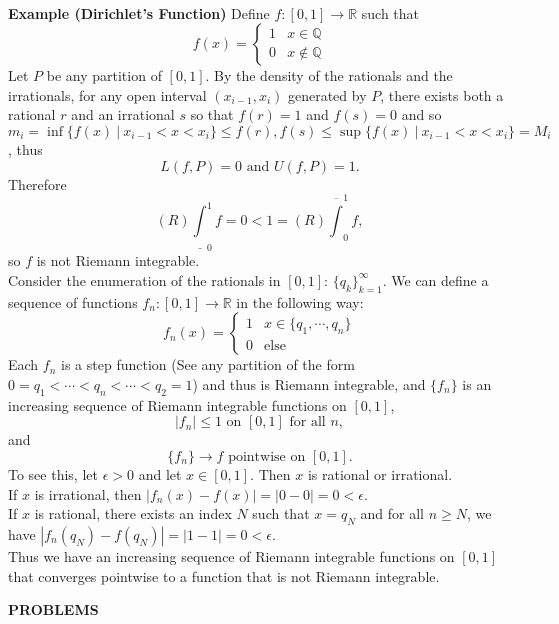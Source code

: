 \begin{flushleft}
\[    \]\\\bigskip
    \textbf{Example (Dirichlet's Function)}
    Define $f:[0,1]\to\mathbb{R}$ such that
    \[
        f(x)=
        \begin{cases}
            1&x\in\mathbb{Q}\\
            0&x\notin\mathbb{Q}
        \end{cases}    
    \] 
    Let $P$ be any partition of $[0,1]$.
    By the density of the rationals and the irrationals, for any open interval $(x_{i-1},x_i)$ generated by $P$, there exists both a rational $r$ and an irrational $s$ so that $f(r)=1$ and $f(s)=0$ and so $m_i=\inf\{f(x)\ |\ x_{i-1}<x<x_i\}\le f(r),f(s)\le\sup\{f(x)\ |\ x_{i-1}<x<x_i\}=M_i$, thus
    \[
        L(f,P)=0\text{ and }U(f,P)=1.
    \]
    Therefore
    \[
        (R)\underline\int_0^1f=0<1=(R)\overline\int_0^1f,
    \]
    so $f$ is not Riemann integrable.
    \\Consider the enumeration of the rationals in $[0,1]$: $\{q_k\}_{k=1}^\infty$.
    We can define a sequence of functions $f_n:[0,1]\to\mathbb{R}$ in the following way:
    \[
        f_n(x)=
        \begin{cases}
            1&x\in\{q_1,\cdots,q_n\}\\
            0&\text{else}
        \end{cases}
    \]
    Each $f_n$ is a step function (See any partition of the form $0=q_1<\cdots<q_n<\cdots<q_2=1$) and thus is Riemann integrable, and $\{f_n\}$ is an increasing sequence of Riemann integrable functions on $[0,1]$,
    \[
        |f_n|\le1\text{ on }[0,1]\text{ for all }n,
    \]
    and 
    \[
        \{f_n\}\to f\text{ pointwise on }[0,1].
    \]
    To see this, let $\epsilon>0$ and let $x\in[0,1]$. 
    Then $x$ is rational or irrational.
    \\If $x$ is irrational, then $|f_n(x)-f(x)|=|0-0|=0<\epsilon$.
    \\If $x$ is rational, there exists an index $N$ such that $x=q_N$ and for all $n\ge N$, we have $|f_n(q_N)-f(q_N)|=|1-1|=0<\epsilon$.
    \\Thus we have an increasing sequence of Riemann integrable functions on $[0,1]$ that converges pointwise to a function that is not Riemann integrable.
\end{flushleft}
\begin{center}
	\textbf{PROBLEMS}
\end{center}
